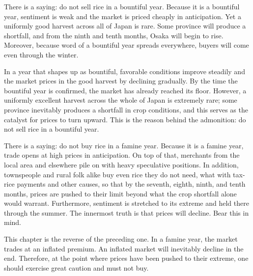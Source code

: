 \begin{sokyubox}
{\small\itshape\color{sokyubar} }

\medskip
There is a saying: do not sell rice in a bountiful year. Because it
is a bountiful year, sentiment is weak and the market is priced
cheaply in anticipation. Yet a uniformly good harvest across all of
Japan is rare. Some province will produce a shortfall, and from the
ninth and tenth months, Osaka will begin to rise. Moreover, because
word of a bountiful year spreads everywhere, buyers will come even
through the winter.
\end{sokyubox}

\commentary
In a year that shapes up as bountiful, favorable conditions improve
steadily and the market prices in the good harvest by declining
gradually. By the time the bountiful year is confirmed, the market
has already reached its floor. However, a uniformly excellent
harvest across the whole of Japan is extremely rare; some province
inevitably produces a shortfall in crop conditions, and this serves
as the catalyst for prices to turn upward. This is the reason behind
the admonition: do not sell rice in a bountiful year.


\begin{sokyubox}
{\small\itshape\color{sokyubar} }

\medskip
There is a saying: do not buy rice in a famine year. Because it is
a famine year, trade opens at high prices in anticipation. On top of
that, merchants from the local area and elsewhere pile on with heavy
speculative positions. In addition, townspeople and rural folk alike
buy even rice they do not need, what with tax-rice payments and
other causes, so that by the seventh, eighth, ninth, and tenth
months, prices are pushed to their limit beyond what the crop
shortfall alone would warrant. Furthermore, sentiment is stretched
to its extreme and held there through the summer. The innermost
truth is that prices will decline. Bear this in mind.
\end{sokyubox}

\commentary
This chapter is the reverse of the preceding one. In a famine year,
the market trades at an inflated premium. An inflated market will
inevitably decline in the end. Therefore, at the point where prices
have been pushed to their extreme, one should exercise great
caution and must not buy.

